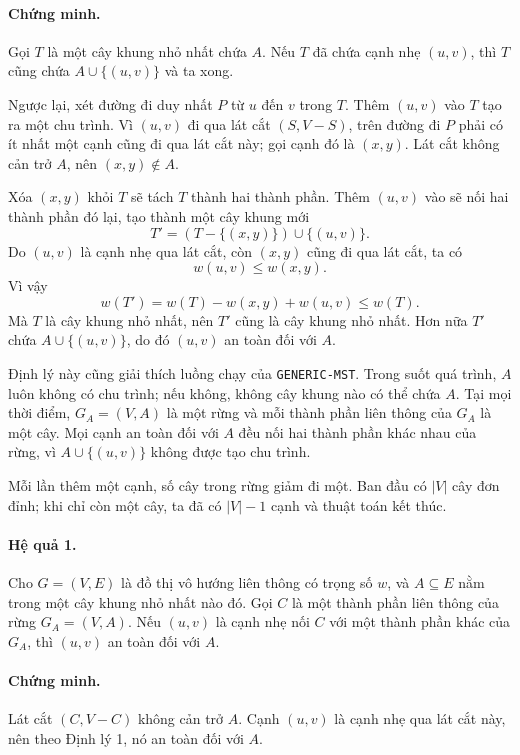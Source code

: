 \documentclass[11pt]{article}
\begin{document}
\paragraph{Chứng minh.}
Gọi $T$ là một cây khung nhỏ nhất chứa $A$. Nếu $T$ đã chứa cạnh nhẹ $(u,v)$,
thì $T$ cũng chứa $A\cup\{(u,v)\}$ và ta xong.

Ngược lại, xét đường đi duy nhất $P$ từ $u$ đến $v$ trong $T$. Thêm $(u,v)$
vào $T$ tạo ra một chu trình. Vì $(u,v)$ đi qua lát cắt $(S,V-S)$, trên đường
đi $P$ phải có ít nhất một cạnh cũng đi qua lát cắt này; gọi cạnh đó là
$(x,y)$. Lát cắt không cản trở $A$, nên $(x,y)\notin A$.

Xóa $(x,y)$ khỏi $T$ sẽ tách $T$ thành hai thành phần. Thêm $(u,v)$ vào sẽ nối
hai thành phần đó lại, tạo thành một cây khung mới
\[
  T'=(T-\{(x,y)\})\cup\{(u,v)\}.
\]
Do $(u,v)$ là cạnh nhẹ qua lát cắt, còn $(x,y)$ cũng đi qua lát cắt, ta có
\[
  w(u,v)\le w(x,y).
\]
Vì vậy
\[
  w(T')=w(T)-w(x,y)+w(u,v)\le w(T).
\]
Mà $T$ là cây khung nhỏ nhất, nên $T'$ cũng là cây khung nhỏ nhất. Hơn nữa
$T'$ chứa $A\cup\{(u,v)\}$, do đó $(u,v)$ an toàn đối với $A$.

Định lý này cũng giải thích luồng chạy của \texttt{GENERIC-MST}. Trong suốt
quá trình, $A$ luôn không có chu trình; nếu không, không cây khung nào có thể
chứa $A$. Tại mọi thời điểm, $G_A=(V,A)$ là một rừng và mỗi thành phần liên
thông của $G_A$ là một cây. Mọi cạnh an toàn đối với $A$ đều nối hai thành
phần khác nhau của rừng, vì $A\cup\{(u,v)\}$ không được tạo chu trình.

Mỗi lần thêm một cạnh, số cây trong rừng giảm đi một. Ban đầu có $|V|$ cây
đơn đỉnh; khi chỉ còn một cây, ta đã có $|V|-1$ cạnh và thuật toán kết thúc.

\paragraph{Hệ quả 1.}
Cho $G=(V,E)$ là đồ thị vô hướng liên thông có trọng số $w$, và $A\subseteq E$
nằm trong một cây khung nhỏ nhất nào đó. Gọi $C$ là một thành phần liên thông
của rừng $G_A=(V,A)$. Nếu $(u,v)$ là cạnh nhẹ nối $C$ với một thành phần khác
của $G_A$, thì $(u,v)$ an toàn đối với $A$.

\paragraph{Chứng minh.}
Lát cắt $(C,V-C)$ không cản trở $A$. Cạnh $(u,v)$ là cạnh nhẹ qua lát cắt này,
nên theo Định lý 1, nó an toàn đối với $A$.
\end{document}
